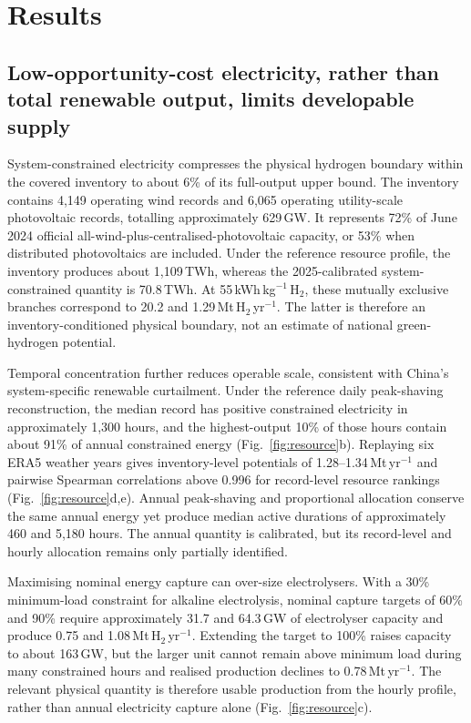 \documentclass[11pt,a4paper]{article}
\begin{document}
\section*{Results}

\subsection*{Low-opportunity-cost electricity, rather than total renewable output, limits developable supply}

System-constrained electricity compresses the physical hydrogen boundary within the covered inventory to about 6\% of its full-output upper bound. The inventory contains 4,149 operating wind records and 6,065 operating utility-scale photovoltaic records, totalling approximately 629\,GW. It represents 72\% of June 2024 official all-wind-plus-centralised-photovoltaic capacity, or 53\% when distributed photovoltaics are included. Under the reference resource profile, the inventory produces about 1,109\,TWh, whereas the 2025-calibrated system-constrained quantity is 70.8\,TWh. At 55\,kWh\,kg$^{-1}$\,H$_2$, these mutually exclusive branches correspond to 20.2 and 1.29\,Mt\,H$_2$\,yr$^{-1}$. The latter is therefore an inventory-conditioned physical boundary, not an estimate of national green-hydrogen potential.

Temporal concentration further reduces operable scale, consistent with China's system-specific renewable curtailment\cite{guo2023grid}. Under the reference daily peak-shaving reconstruction, the median record has positive constrained electricity in approximately 1,300 hours, and the highest-output 10\% of those hours contain about 91\% of annual constrained energy (Fig.~\ref{fig:resource}b). Replaying six ERA5 weather years gives inventory-level potentials of 1.28--1.34\,Mt\,yr$^{-1}$ and pairwise Spearman correlations above 0.996 for record-level resource rankings (Fig.~\ref{fig:resource}d,e). Annual peak-shaving and proportional allocation conserve the same annual energy yet produce median active durations of approximately 460 and 5,180 hours. The annual quantity is calibrated, but its record-level and hourly allocation remains only partially identified.

Maximising nominal energy capture can over-size electrolysers. With a 30\% minimum-load constraint for alkaline electrolysis, nominal capture targets of 60\% and 90\% require approximately 31.7 and 64.3\,GW of electrolyser capacity and produce 0.75 and 1.08\,Mt\,H$_2$\,yr$^{-1}$. Extending the target to 100\% raises capacity to about 163\,GW, but the larger unit cannot remain above minimum load during many constrained hours and realised production declines to 0.78\,Mt\,yr$^{-1}$. The relevant physical quantity is therefore usable production from the hourly profile, rather than annual electricity capture alone (Fig.~\ref{fig:resource}c).
\end{document}
